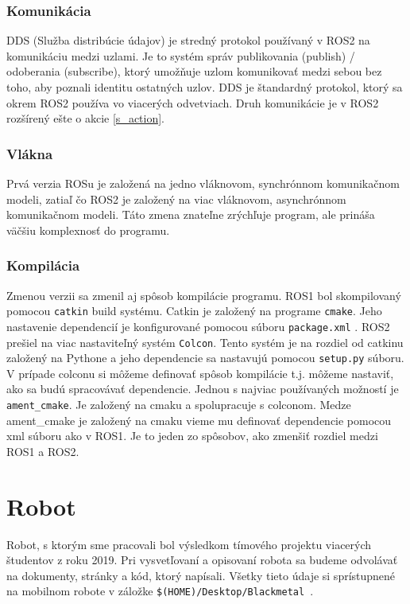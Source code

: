 \subsubsection{Komunikácia}

	DDS (Služba distribúcie údajov) je stredný protokol používaný v ROS2 na komunikáciu medzi uzlami. Je to systém správ
	publikovania (publish) / odoberania (subscribe), ktorý umožňuje uzlom komunikovať medzi sebou bez toho, aby poznali identitu ostatných uzlov. DDS je
	štandardný protokol, ktorý sa okrem ROS2 používa vo viacerých odvetviach. \cite{chatgpt} Druh komunikácie je v ROS2 rozšírený ešte o akcie \ref{s_action}.

\subsubsection{Vlákna}

	Prvá verzia ROSu je založená na jedno vláknovom, synchrónnom komunikačnom modeli, zatiaľ čo ROS2 je založený na viac vláknovom, asynchrónnom
	komunikačnom modeli. Táto zmena znateľne zrýchľuje program, ale prináša väčšiu komplexnosť do programu.

\subsubsection{Kompilácia}

	Zmenou verzii sa zmenil aj spôsob kompilácie programu. ROS1 bol skompilovaný pomocou \texttt{catkin} build systému. Catkin je založený na programe
	\texttt{cmake}. Jeho nastavenie dependencií je konfigurované pomocou súboru \texttt{package.xml} . ROS2 prešiel na viac nastaviteľný systém \texttt{Colcon}.
	Tento systém je na rozdiel od catkinu založený na Pythone a jeho dependencie sa nastavujú pomocou \texttt{setup.py} súboru. V prípade colconu si môžeme definovať
	spôsob kompilácie t.j. môžeme nastaviť, ako sa budú spracovávať dependencie. Jednou s najviac používaných možností je \texttt{ament\_cmake}. Je založený
	na cmaku a spolupracuje s colconom. Medze ament\_cmake je založený na cmaku vieme mu definovať dependencie pomocou xml súboru ako v ROS1. Je to jeden zo spôsobov,
	ako zmenšiť rozdiel medzi ROS1 a ROS2.

\section{Robot}

Robot, s ktorým sme pracovali bol výsledkom tímového projektu viacerých študentov \newline z roku 2019. Pri vysvetľovaní a opisovaní robota sa budeme odvolávať
na dokumenty, stránky a kód, ktorý napísali. Všetky tieto údaje si sprístupnené na mobilnom robote v záložke
\newline \texttt{\$(HOME)/Desktop/Blackmetal}~\cite{timovyProjekt}.

